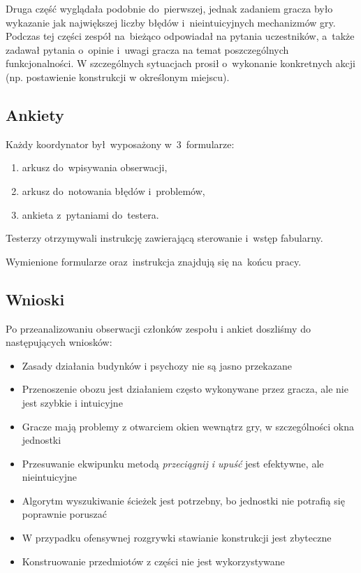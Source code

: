 \documentclass[licencjacka]{pracamgr}
\begin{document}
      Druga część wyglądała podobnie do~pierwszej, jednak zadaniem gracza było wykazanie
      jak największej liczby błędów i~nieintuicyjnych mechanizmów gry.
      Podczas tej części zespół na~bieżąco odpowiadał na pytania uczestników,
      a~także zadawał pytania o~opinie i~uwagi gracza na temat poszczególnych funkcjonalności.
      W szczególnych sytuacjach prosił o~wykonanie konkretnych akcji (np. postawienie konstrukcji w określonym miejscu).

    \subsection{Ankiety}
      Każdy koordynator był~wyposażony w~3~formularze:
      \begin{enumerate}
	\item arkusz do~wpisywania obserwacji,
	\item arkusz do~notowania błędów i~problemów,
	\item ankieta z~pytaniami do~testera.
      \end{enumerate}
      Testerzy otrzymywali instrukcję zawierającą sterowanie i~wstęp fabularny.

      \noindent
      Wymienione formularze oraz~instrukcja znajdują się na~końcu pracy.

    \subsection{Wnioski}
      Po przeanalizowaniu obserwacji członków zespołu i ankiet doszliśmy do następujących wniosków:
      \begin{itemize}
	\item Zasady działania budynków i psychozy nie są jasno przekazane
	\item Przenoszenie obozu jest działaniem często wykonywane przez gracza, ale nie jest szybkie i intuicyjne
	\item Gracze mają problemy z otwarciem okien wewnątrz gry, w szczególności okna jednostki
	\item Przesuwanie ekwipunku metodą \emph{przeciągnij i upuść} jest efektywne, ale nieintuicyjne
	\item Algorytm wyszukiwanie ścieżek jest potrzebny, bo jednostki nie potrafią się poprawnie poruszać
	\item W przypadku ofensywnej rozgrywki stawianie konstrukcji jest zbyteczne
	\item Konstruowanie przedmiotów z części nie jest wykorzystywane
      \end{itemize}
\end{document}

